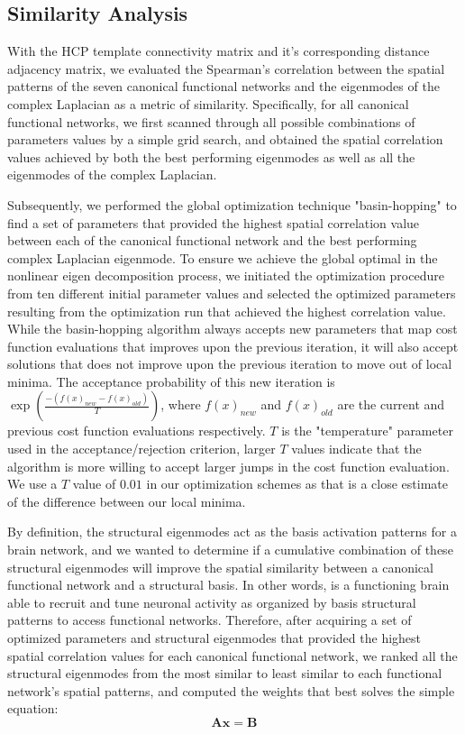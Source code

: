\documentclass{article}
\begin{document}
\subsection{Similarity Analysis}
With the HCP template connectivity matrix and it's corresponding distance adjacency matrix, we evaluated the Spearman's correlation between the spatial patterns of the seven canonical functional networks and the eigenmodes of the complex Laplacian as a metric of similarity. Specifically, for all canonical functional networks, we first scanned through all possible combinations of parameters values by a simple grid search, and obtained the spatial correlation values achieved by both the best performing eigenmodes as well as all the eigenmodes of the complex Laplacian. 

Subsequently, we performed the global optimization technique "basin-hopping" \cite{Wales1997} to find a set of parameters that provided the highest spatial correlation value between each of the canonical functional network and the best performing complex Laplacian eigenmode. To ensure we achieve the global optimal in the nonlinear eigen decomposition process, we initiated the optimization procedure from ten different initial parameter values and selected the optimized parameters resulting from the optimization run that achieved the highest correlation value. While the basin-hopping algorithm always accepts new parameters that map cost function evaluations that improves upon the previous iteration, it will also accept solutions that does not improve upon the previous iteration to move out of local minima. The acceptance probability of this new iteration is $\exp(\frac{-(f(x)_{new} - f(x)_{old})}{T})$, where $f(x)_{new}$ and $f(x)_{old}$ are the current and previous cost function evaluations respectively. $T$ is the "temperature" parameter used in the acceptance/rejection criterion, larger $T$ values indicate that the algorithm is more willing to accept larger jumps in the cost function evaluation. We use a $T$ value of $0.01$ in our optimization schemes as that is a close estimate of the difference between our local minima.

By definition, the structural eigenmodes act as the basis activation patterns for a brain network, and we wanted to determine if a cumulative combination of these structural eigenmodes will improve the spatial similarity between a canonical functional network and a structural basis. In other words, is a functioning brain able to recruit and tune neuronal activity as organized by basis structural patterns to access functional networks. Therefore, after acquiring a set of optimized parameters and structural eigenmodes that provided the highest spatial correlation values for each canonical functional network, we ranked all the structural eigenmodes from the most similar to least similar to each functional network's spatial patterns, and computed the weights that best solves the simple equation:
\begin{equation}
    \mathbf{Ax = B}
\end{equation}
\end{document}
